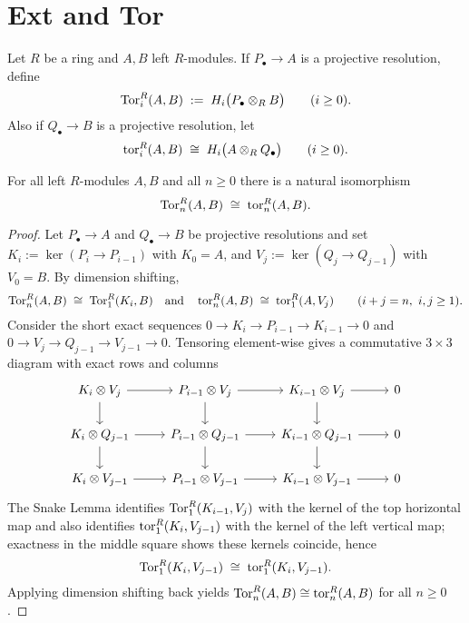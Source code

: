 \section{Ext and Tor}

Let \( R \) be a ring and \( A,B \) left \( R \)-modules. If \( P_\bullet \to A \) is a projective resolution, define
\[
	\operatorname{Tor}_i^R(A,B)\;:=\; H_i\bigl(P_\bullet \otimes_R B\bigr)\qquad (i\ge 0).
\]
Also if \( Q_\bullet \to B \) is a projective resolution, let
\[
	\operatorname{tor}_i^R(A,B)\;\cong\; H_i\bigl(A \otimes_R Q_\bullet\bigr)\qquad (i\ge 0).
\]

\begin{theorem*}
	For all left \( R \)-modules \( A,B \) and all \( n\ge 0 \) there is a natural isomorphism
	\[
		\operatorname{Tor}_n^R(A,B)\;\cong\; \operatorname{tor}_n^R(A,B).
	\]
\end{theorem*}

\begin{proof}
	Let \( P_\bullet\to A \) and \( Q_\bullet\to B \) be projective resolutions and set \( K_i:=\ker(P_i\to P_{i-1}) \) with \( K_0=A \), and \( V_j:=\ker(Q_j\to Q_{j-1}) \) with \( V_0=B \). By dimension shifting,
	\[
		\operatorname{Tor}_n^R(A,B)\;\cong\; \operatorname{Tor}_1^R(K_i,B)\quad\text{and}\quad \operatorname{tor}_n^R(A,B)\;\cong\; \operatorname{tor}_1^R(A,V_j)\qquad(i+j=n,\ i,j\ge1).
	\]
	Consider the short exact sequences \( 0\to K_i\to P_{i-1}\to K_{i-1}\to 0 \) and \( 0\to V_j\to Q_{j-1}\to V_{j-1}\to 0 \). Tensoring element-wise gives a commutative \( 3\times3 \) diagram with exact rows and columns
	\[
		\begin{tikzcd}
			K_i\otimes V_j \arrow[r] \arrow[d] & P_{i-1}\otimes V_j \arrow[r] \arrow[d] & K_{i-1}\otimes V_j \arrow[r] \arrow[d] & 0 \\
			K_i\otimes Q_{j-1} \arrow[r] \arrow[d] & P_{i-1}\otimes Q_{j-1} \arrow[r] \arrow[d] & K_{i-1}\otimes Q_{j-1} \arrow[r] \arrow[d] & 0 \\
			K_i\otimes V_{j-1} \arrow[r] & P_{i-1}\otimes V_{j-1} \arrow[r] & K_{i-1}\otimes V_{j-1} \arrow[r] & 0
		\end{tikzcd}
	\]
	The Snake Lemma identifies \( \operatorname{Tor}_1^R(K_{i-1},V_j) \) with the kernel of the top horizontal map and also identifies \( \operatorname{tor}_1^R(K_i,V_{j-1}) \) with the kernel of the left vertical map; exactness in the middle square shows these kernels coincide, hence
	\[
		\operatorname{Tor}_1^R(K_i,V_{j-1})\;\cong\; \operatorname{tor}_1^R(K_i,V_{j-1}).
	\]
	Applying dimension shifting back yields \( \operatorname{Tor}_n^R(A,B)\cong\operatorname{tor}_n^R(A,B) \) for all \( n\ge0 \).
\end{proof}

